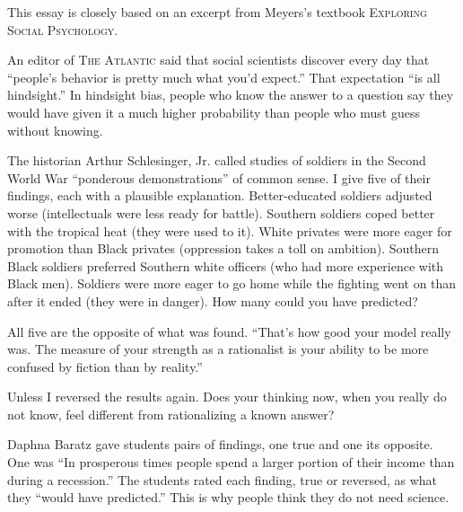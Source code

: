 
This essay is closely based on an excerpt from Meyers's textbook \textsc{Exploring Social Psychology}.

An editor of \textsc{The Atlantic} said that social scientists discover every day that ``people's behavior is pretty much what you'd expect.'' That expectation ``is all hindsight.'' In hindsight bias, people who know the answer to a question say they would have given it a much higher probability than people who must guess without knowing. 

The historian Arthur Schlesinger, Jr. called studies of soldiers in the Second World War ``ponderous demonstrations'' of common sense. I give five of their findings, each with a plausible explanation. Better-educated soldiers adjusted worse (intellectuals were less ready for battle). Southern soldiers coped better with the tropical heat (they were used to it). White privates were more eager for promotion than Black privates (oppression takes a toll on ambition). Southern Black soldiers preferred Southern white officers (who had more experience with Black men). Soldiers were more eager to go home while the fighting went on than after it ended (they were in danger). How many could you have predicted?

All five are the opposite of what was found.  ``That's how good your model really was. The measure of your strength as a rationalist is your ability to be more confused by fiction than by reality.'' 

Unless I reversed the results again. Does your thinking now, when you really do not know, feel different from rationalizing a known answer?

Daphna Baratz gave students pairs of findings, one true and one its opposite. One was ``In prosperous times people spend a larger portion of their income than during a recession.'' The students rated each finding, true or reversed, as what they ``would have predicted.'' This is why people think they do not need science.

